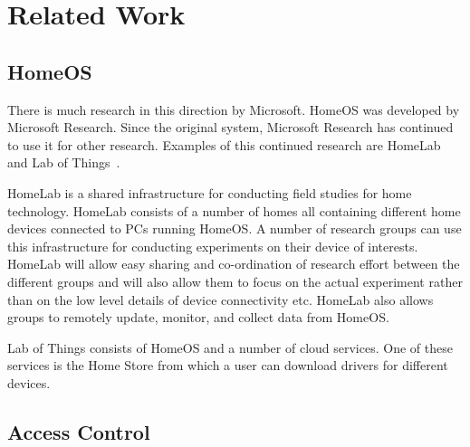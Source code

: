 \section{Related Work}
\label{sec:related}
\subsection{HomeOS}
There is much research in this direction by Microsoft. HomeOS was developed by
Microsoft Research. Since the original system, Microsoft Research has continued
to use it for other research. Examples of this continued research are
HomeLab~\cite{homeLab} and Lab of Things~\cite{labOfThings}.

HomeLab is a shared infrastructure for conducting field studies for home
technology. HomeLab consists of a number of homes all containing different home
devices connected to PCs running HomeOS. A number of research groups can use
this infrastructure for conducting experiments on their device of interests.
HomeLab will allow easy sharing and co-ordination of research effort between the
different groups and will also allow them to focus on the actual experiment
rather than on the low level details of device connectivity etc. HomeLab also
allows groups to remotely update, monitor, and collect data from HomeOS.

Lab of Things consists of HomeOS and a number of cloud services. One of these
services is the Home Store from which a user can download drivers for different
devices.
\subsection{Access Control}

